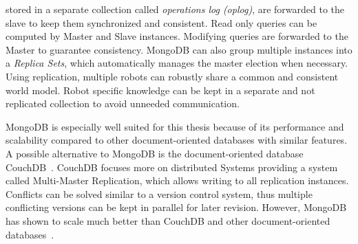 stored in a separate collection called \emph{operations log (oplog)}, are forwarded to
the slave to keep them synchronized and consistent.
Read only queries can be
computed by Master and Slave instances. Modifying queries are
forwarded to the Master to guarantee consistency.
MongoDB can also group multiple
instances into a \emph{Replica Sets}, which automatically manages
the master election when necessary. Using replication,
multiple robots can robustly share a common and consistent world
model. Robot specific knowledge can be kept in a separate and not
replicated collection to avoid unneeded communication.

MongoDB is especially well suited for this thesis because of its
performance and scalability compared to other document-oriented
databases with similar features. A possible alternative to MongoDB is
the document-oriented database CouchDB~\cite{CouchDB}. CouchDB
focuses more on distributed Systems providing a system called
Multi-Master Replication, which allows writing to all replication instances.
Conflicts can be solved similar to a version
control system, thus multiple conflicting versions can be kept in
parallel for later revision. However, MongoDB has shown to scale much
better than CouchDB and other document-oriented databases~\cite{db-comparison}.

